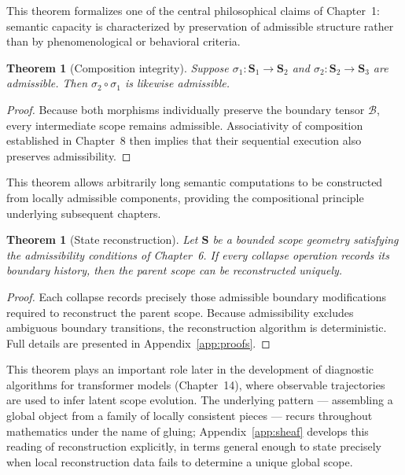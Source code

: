 \documentclass[11pt,twoside,openright]{book}
\numberwithin{equation}{chapter}
\theoremstyle{definition}
\theoremstyle{plain}
\newtheorem{theorem}[definition]{Theorem}
\theoremstyle{remark}
\theoremstyle{definition}
\newcommand{\Scope}{\mathbf{S}}
\newcommand{\ScopeMorph}{\sigma}
\newcommand{\Boundary}{\mathcal{B}}
\begin{document}
This theorem formalizes one of the central philosophical claims of
Chapter~1: semantic capacity is characterized by preservation of
admissible structure rather than by phenomenological or behavioral
criteria.

\begin{theorem}[Composition integrity]
Suppose $\ScopeMorph_1:\Scope_1\to\Scope_2$ and
$\ScopeMorph_2:\Scope_2\to\Scope_3$ are admissible. Then
$\ScopeMorph_2\circ\ScopeMorph_1$ is likewise admissible.
\end{theorem}

\begin{proof}
Because both morphisms individually preserve the boundary tensor
$\Boundary$, every intermediate scope remains admissible. Associativity of
composition established in Chapter~8 then implies that their sequential
execution also preserves admissibility.
\end{proof}

This theorem allows arbitrarily long semantic computations to be
constructed from locally admissible components, providing the
compositional principle underlying subsequent chapters.

\begin{theorem}[State reconstruction]
Let $\Scope$ be a bounded scope geometry satisfying the admissibility
conditions of Chapter~6. If every collapse operation records its boundary
history, then the parent scope can be reconstructed uniquely.
\end{theorem}

\begin{proof}
Each collapse records precisely those admissible boundary modifications
required to reconstruct the parent scope. Because admissibility excludes
ambiguous boundary transitions, the reconstruction algorithm is
deterministic. Full details are presented in Appendix~\ref{app:proofs}.
\end{proof}

This theorem plays an important role later in the development of
diagnostic algorithms for transformer models (Chapter~14), where
observable trajectories are used to infer latent scope evolution. The
underlying pattern --- assembling a global object from a family of
locally consistent pieces --- recurs throughout mathematics under the
name of gluing; Appendix~\ref{app:sheaf} develops this reading of
reconstruction explicitly, in terms general enough to state precisely
when local reconstruction data fails to determine a unique global scope.
\end{document}
